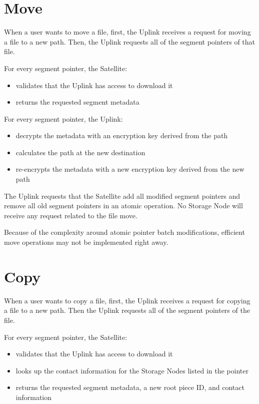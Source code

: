 \documentclass[8pt,fleqn,openany]{book}
\begin{document}
\section{Move}

When a user wants to move a file,
first, the Uplink receives a request for moving a file to a new path.
Then, the Uplink requests all of the segment pointers of that file.

For every segment pointer, the Satellite:
  \begin{itemize}
  \item validates that the Uplink has access to download it
  \item returns the requested segment metadata
  \end{itemize}

For every segment pointer, the Uplink:
  \begin{itemize}
  \item decrypts the metadata with an encryption key derived from the path
  \item calculates the path at the new destination
  \item re-encrypts the metadata with a new encryption key derived from the
    new path
  \end{itemize}

 The Uplink requests that the Satellite add
  all modified segment pointers and remove all old segment pointers in an
  atomic operation.
 No Storage Node will receive any request related to the file move.

Because of the complexity around atomic pointer batch modifications, efficient
move operations may not be implemented right away.

\section{Copy}

When a user wants to copy a file, first, the Uplink receives a request for
copying a file to a new path.
Then the Uplink requests all of the segment pointers of the file.

For every segment pointer, the Satellite:
  \begin{itemize}
  \item validates that the Uplink has access to download it
  \item looks up the contact information for the Storage Nodes listed in the
    pointer
  \item returns the requested segment metadata, a new root piece ID, and
    contact information
  \end{itemize}
\end{document}
